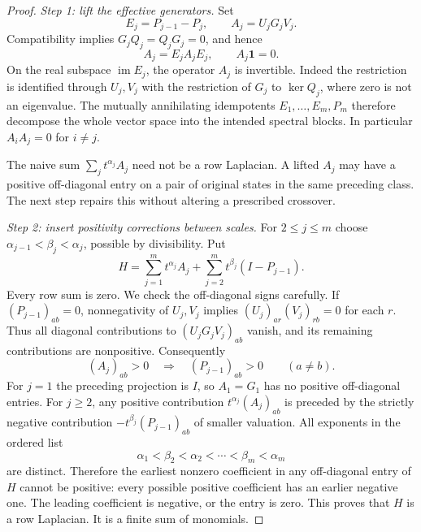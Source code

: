 \documentclass[11pt]{article}
\numberwithin{equation}{section}
\theoremstyle{definition}
\theoremstyle{remark}
\newcommand{\one}{\mathbf 1}
\newcommand{\im}{\operatorname{im}}
\begin{document}
\begin{proof}
\emph{Step 1: lift the effective generators.}
Set
\[
 E_j=P_{j-1}-P_j,\qquad A_j=U_jG_jV_j.
\]
Compatibility implies $G_jQ_j=Q_jG_j=0$, and hence
\begin{equation}\label{markov:eq:lifted-blocks}
 A_j=E_jA_jE_j,\qquad A_j\one=0.
\end{equation}
On the real subspace $\im E_j$, the operator $A_j$ is invertible. Indeed the
restriction is identified through $U_j,V_j$ with the restriction of $G_j$ to
$\ker Q_j$, where zero is not an eigenvalue. The mutually annihilating
idempotents $E_1,\ldots,E_m,P_m$ therefore decompose the whole vector space
into the intended spectral blocks. In particular $A_iA_j=0$ for $i\ne j$.

The naive sum $\sum_jt^{\alpha_j}A_j$ need not be a row Laplacian. A lifted
$A_j$ may have a positive off-diagonal entry on a pair of original states in the
same preceding class. The next step repairs this without altering a prescribed
crossover.

\emph{Step 2: insert positivity corrections between scales.}
For $2\le j\le m$ choose
$\alpha_{j-1}<\beta_j<\alpha_j$, possible by divisibility. Put
\begin{equation}\label{markov:eq:general-construction}
 H=\sum_{j=1}^m t^{\alpha_j}A_j
       +\sum_{j=2}^m t^{\beta_j}(I-P_{j-1}).
\end{equation}
Every row sum is zero. We check the off-diagonal signs carefully.
If $(P_{j-1})_{ab}=0$, nonnegativity of $U_j,V_j$ implies
$(U_j)_{ar}(V_j)_{rb}=0$ for each $r$. Thus all diagonal contributions to
$(U_jG_jV_j)_{ab}$ vanish, and its remaining contributions are nonpositive.
Consequently
\begin{equation}\label{markov:eq:sign-cover}
 (A_j)_{ab}>0\quad\Longrightarrow\quad (P_{j-1})_{ab}>0
 \qquad(a\ne b).
\end{equation}
For $j=1$ the preceding projection is $I$, so $A_1=G_1$ has no positive
off-diagonal entries. For $j\ge2$, any positive contribution
$t^{\alpha_j}(A_j)_{ab}$ is preceded by the strictly negative contribution
$-t^{\beta_j}(P_{j-1})_{ab}$ of smaller valuation. All exponents in the ordered
list
\[
 \alpha_1<\beta_2<\alpha_2<\cdots<\beta_m<\alpha_m
\]
are distinct. Therefore the earliest nonzero coefficient in any off-diagonal
entry of $H$ cannot be positive: every possible positive coefficient has an
earlier negative one. The leading coefficient is negative, or the entry is
zero. This proves that $H$ is a row Laplacian. It is a finite sum of monomials.


\end{proof}
\end{document}
